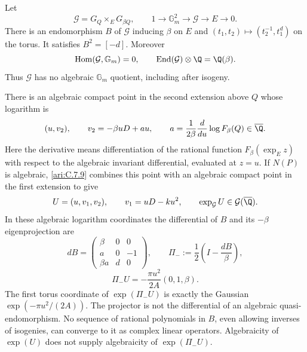 \begin{proposition}\label{ari:C.7.10}
Let
\[
 \mathcal G=G_Q\mathbin{\times_E}G_{\beta Q},\qquad
 1\longrightarrow\mathbb G_m^2\longrightarrow\mathcal G
       \longrightarrow E\longrightarrow0.
\]
There is an endomorphism $B$ of $\mathcal G$ inducing
$\beta$ on $E$ and
$(t_1,t_2)\mapsto(t_2^{-1},t_1^d)$ on the torus.
It satisfies $B^2=[-d]$. Moreover
\[
 \operatorname{Hom}(\mathcal G,\mathbb G_m)=0,
 \qquad
 \operatorname{End}(\mathcal G)\otimes\Q=\Q(\beta).
\]
Thus $\mathcal G$ has no algebraic $\mathbb G_m$ quotient,
including after isogeny.

There is an algebraic compact point in the second extension
above $Q$ whose logarithm is
\[
 (u,v_2),\qquad v_2=-\beta uD+au,
 \qquad
 a=\frac1{2\beta}
       \frac{d}{du}\log F_\beta(Q)\in\overline\Q.
\]
Here the derivative means differentiation of the rational
function $F_\beta(\exp_E z)$ with respect to the algebraic
invariant differential, evaluated at $z=u$.
If $N(P)$ is algebraic, \ref{ari:C.7.9} combines this point with an
algebraic compact point in the first extension to give
\[
 U=(u,v_1,v_2),\qquad v_1=uD-ku^2,
 \qquad \exp_{\mathcal G}U\in\mathcal G(\overline\Q).
\]
In these algebraic logarithm coordinates the differential of
$B$ and its $-\beta$ eigenprojection are
\[
 dB=\begin{pmatrix}
 \beta&0&0\\ a&0&-1\\ \beta a&d&0
 \end{pmatrix},\qquad
 \Pi_-:=\frac12\left(I-\frac{dB}{\beta}\right),
\]
\[
 \Pi_-U=-\frac{\pi u^2}{2A}(0,1,\beta).
\]
The first torus coordinate of $\exp(\Pi_-U)$ is exactly
the Gaussian $\exp(-\pi u^2/(2A))$. The projector is not
the differential of an algebraic quasi-endomorphism. No
sequence of rational polynomials in $B$, even allowing
inverses of isogenies, can converge to it as complex linear
operators. Algebraicity of $\exp(U)$ does not supply
algebraicity of $\exp(\Pi_-U)$.
\end{proposition}

